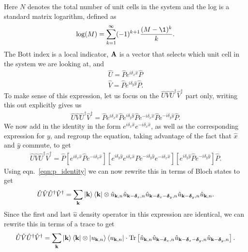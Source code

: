 Here $N$ denotes the total number of unit cells in the system and the log is a standard matrix logarithm, defined as
\begin{align}
	\log (M) = \sum_{k=1}^\infty (-1)^{k+1} \frac{(M-\1)^k}{k}.
\end{align}
The Bott index is a local indicator, $\bf A$ is a vector that selects which unit cell in the system we are looking at, and
\begin{align}
	\hat U  = \hat P e^{i \delta_x \hat x} \hat P \\
	\hat V  = \hat P e^{i \delta_y \hat y} \hat P.
\end{align}
To make sense of this expression, let us focus on the $ \hat U\hat V\hat U^\dag \hat V^\dag$ part only, writing this out explicitly gives us
\begin{align}
	 \hat U\hat V\hat U^\dag \hat V^\dag = \hat P e^{i \delta_x \hat x} \hat P e^{i \delta_y \hat y} \hat P e^{- i \delta_x \hat x} \hat P e^{-i \delta_y \hat y} \hat P.
\end{align}
We now add in the identity in the form $e^{i \delta_x \hat x} e^{-i \delta_x \hat x} $, as well as the corresponding expression for $y$, and regroup the equation, taking advantage of the fact that $\hat x$ and $\hat y$ commute, to get
\begin{align}
	 \hat U\hat V\hat U^\dag \hat V^\dag =  \hat P
	  \left [ e^{i \delta_x \hat x} \hat P e^{-i \delta_x \hat x} \right]
	  \left [ e^{i \delta_y \hat y} e^{i \delta_x \hat x} \hat P  e^{-i \delta_y \hat y} e^{- i \delta_x \hat x } \right]
	  \left [ e^{i \delta_y \hat y} \hat P e^{-i \delta_y \hat y } \right]
	 \hat P.
\end{align}
Using eqn.~\ref{eqn:p_identity} we can now rewrite this in terms of Bloch states to get
\begin{align}
	\hat U\hat V\hat U^\dag \hat V^\dag = \sum_{\bf k} \ket{\bf k } \bra{\bf k } \otimes  \hat u_{\bf k, n}  \hat u_{\bf k -\boldsymbol{\delta}_x , n}  \hat u_{\bf k-\boldsymbol{\delta}_x-\boldsymbol{\delta}_y, n}  \hat u_{\bf k-\boldsymbol{\delta}_y, n}  \hat u_{\bf k, n}.
\end{align}
Since the first and last $\hat u$ density operator in this expression are identical, we can rewrite this in terms of a trace to get
\begin{align}
	\hat U\hat V\hat U^\dag \hat V^\dag = \sum_{\bf k} \ket{\bf k } \bra{\bf k } \otimes  \ket {u_{\bf k, n}} \bra{u_{\bf k, n}} \cdot  \tr \left [ \hat u_{\bf k, n} \hat u_{\bf k -\boldsymbol{\delta}_x , n}  \hat u_{\bf k-\boldsymbol{\delta}_x-\boldsymbol{\delta}_y, n}  \hat u_{\bf k-\boldsymbol{\delta}_y, n} \right ].
\end{align}
